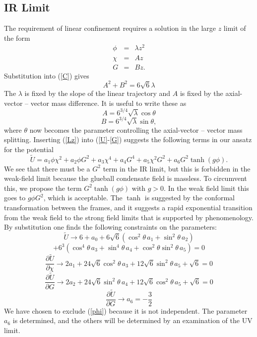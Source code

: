 \documentclass[12pt]{article}
\newcommand{\be}{\begin{equation}}
\newcommand{\ee}{\end{equation}}
\newcommand{\ba}{\begin{eqnarray}}
\newcommand{\ea}{\end{eqnarray}}
\newcommand{\bd}{\begin{displaymath}}
\newcommand{\ed}{\end{displaymath}}
\def\tthalf{{\textstyle{\frac{3}{2}}}}
\def\rt6{\sqrt{6}}
\begin{document}
\subsection{IR Limit}
The requirement of linear confinement requires a solution in the large $z$ limit of the  form
\ba
\phi &=& \lambda z^2 \\
\chi &=& Az \\
G &=& B z.
\label{Lz}
\ea
Substitution into (\ref{C}) gives
\be
A^2 + B^2 = 6\rt6 \lambda
\label{Clarge}
\ee
The $\lambda$ is fixed by the slope of the linear trajectory and $A$ is fixed by the axial-vector -- vector mass difference.  
It is useful to write these as
\bd
A = 6^{3/4} \sqrt{\lambda} \cos\theta
\ed
\be
B = 6^{3/4} \sqrt{\lambda} \sin\theta,
\ee
where $\theta$ now becomes the parameter controlling the axial-vector -- vector mass splitting.
Inserting (\ref{Lz}) into (\ref{U}-\ref{G}) suggests the following terms in our ansatz for the potential
\be
\tilde{U} =  a_1 \phi \chi^2 + a_2 \phi G^2 + a_3 \chi^4 + a_4 G^4 + a_5 \chi^2 G^2 
+ a_6 G^2 \tanh(g\phi).
\ee
We see that there must be a $G^2$ term in the IR limit, but this is forbidden in the weak-field limit because the glueball condensate field is massless. 
To circumvent this, we propose the term $G^2 \tanh(g\phi)$ with $g>0$.  
In the weak field limit this goes to $g\phi G^2$, which is acceptable.  
The $\tanh$ is suggested by the conformal transformation between the frames, and it suggests a rapid exponential transition from the weak field to the strong field limits that is supported by phenomenology.
By substitution one finds the following constraints on the parameters:
\bd
\tilde{U} \rightarrow 6 + a_0 + 6\rt6 \left( \cos^2 \theta \, a_1 + \sin^2 \theta \, a_2 \right)
\ed
\be
+ 6^3 \left( \cos^4 \theta \, a_3 + \sin^4 \theta \, a_4 + \cos^2 \theta \sin^2 \theta \, a_5 \right) = 0
\ee
\be
\frac{\partial \tilde{U}}{\partial \chi} \rightarrow
2a_1 + 24\rt6 \cos^2\theta \, a_3 + 12\rt6 \sin^2\theta \, a_5 + \rt6 = 0
\ee
\be
\frac{\partial \tilde{U}}{\partial G} \rightarrow
2a_2 + 24\rt6 \sin^2\theta \, a_4 + 12\rt6 \cos^2\theta \, a_5 + \rt6 = 0
\ee
\be
\frac{\partial \tilde{U}}{\partial G} \rightarrow
a_6 = - \tthalf \label{LargeZ2}
\ee
We have chosen to exclude (\ref{phi}) because it is not independent. 
The parameter $a_6$ is determined, and the others will be determined by an examination of the UV limit.
\end{document}

